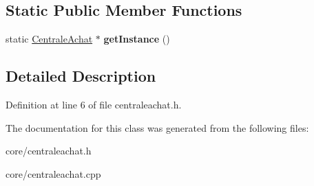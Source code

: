 \subsection*{Static Public Member Functions}
\begin{DoxyCompactItemize}
\item 
\hypertarget{class_centrale_achat_a37c804f07ef285da8ba58a2a6020335f}{
static \hyperlink{class_centrale_achat}{CentraleAchat} $\ast$ {\bfseries getInstance} ()}
\label{d3/d04/class_centrale_achat_a37c804f07ef285da8ba58a2a6020335f}

\end{DoxyCompactItemize}


\subsection{Detailed Description}


Definition at line 6 of file centraleachat.h.



The documentation for this class was generated from the following files:\begin{DoxyCompactItemize}
\item 
core/centraleachat.h\item 
core/centraleachat.cpp\end{DoxyCompactItemize}
